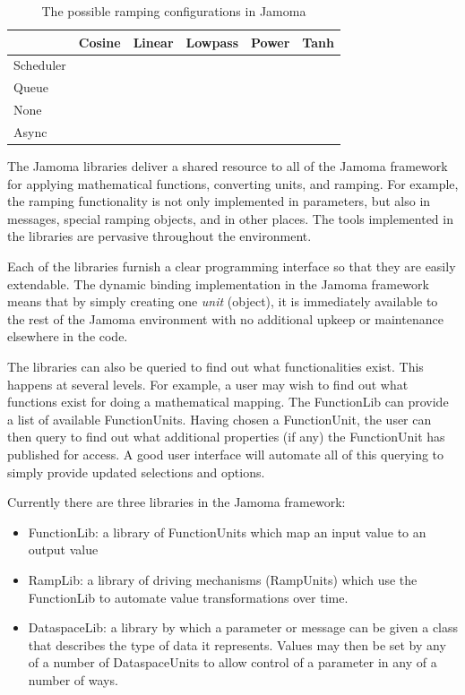 \documentclass{article}
\begin{document}
\begin{table}
\begin{center}
\footnotesize\noindent
\begin{tabular}{|l|l|l|l|l|l|}
\hline
          & Cosine & Linear & Lowpass & Power & Tanh \\
\hline
Scheduler &        &        &         &       & \\
\hline
Queue	  &        &        &         &       & \\
\hline
None	  &        &        &         &       & \\
\hline
Async	  &        &        &         &       & \\
\hline
\end{tabular}
\end{center}
\caption{The possible ramping configurations in Jamoma}
\label{tab:ramp_possibilities}
\end{table}




The Jamoma libraries deliver a shared resource to all of the Jamoma framework for applying mathematical functions, converting units, and ramping. For example, the ramping functionality is not only implemented in parameters, but also in messages, special ramping objects, and in other places. The tools implemented in the libraries are pervasive throughout the environment.

Each of the libraries furnish a clear programming interface so that they are easily extendable. The dynamic binding implementation in the Jamoma framework means that by simply creating one \emph{unit} (object), it is immediately available to the rest of the Jamoma environment with no additional upkeep or maintenance elsewhere in the code.

The libraries can also be queried to find out what functionalities exist. This happens at several levels.  For example, a user may wish to find out what functions exist for doing a mathematical mapping. The FunctionLib can provide a list of available FunctionUnits. Having chosen a FunctionUnit, the user can then query to find out what additional properties (if any) the FunctionUnit has published for access. A good user interface will automate all of this querying to simply provide updated selections and options.

Currently there are three libraries in the Jamoma framework:
\begin{itemize}
	\item FunctionLib: a library of FunctionUnits which map an input value to an output value
	\item RampLib: a library of driving mechanisms (RampUnits) which use the FunctionLib to automate value transformations over time.
	\item DataspaceLib: a library by which a parameter or message can be given a class that describes the type of data it represents.  Values may then be set by any of a number of DataspaceUnits to allow control of a parameter in any of a number of ways.
\end{itemize}
\end{document}
